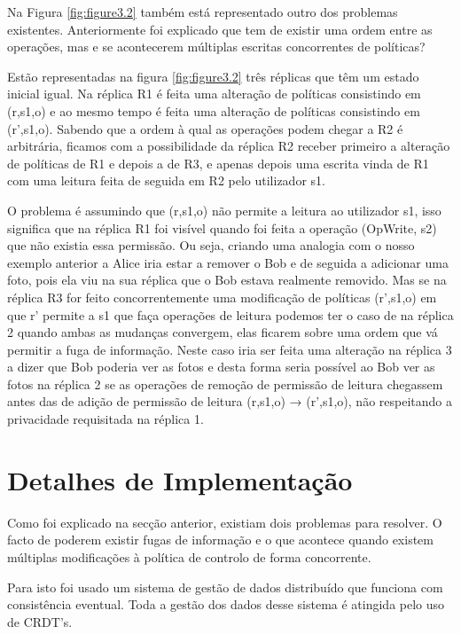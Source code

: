 \documentclass[runningheads,a4paper]{llncs}
\begin{document}
Na Figura \ref{fig:figure3.2} também está representado outro dos problemas existentes. Anteriormente foi explicado que tem de existir uma ordem entre as operações, mas e se acontecerem múltiplas escritas concorrentes de políticas?

Estão representadas na figura \ref{fig:figure3.2} três réplicas que têm um estado inicial igual. Na réplica R1 é feita uma alteração de políticas consistindo em (r,s1,o) e ao mesmo tempo é feita uma alteração de políticas consistindo em (r',s1,o). Sabendo que a ordem à qual as operações podem chegar a R2 é arbitrária, ficamos com a possibilidade da réplica R2 receber primeiro a alteração de políticas de R1 e depois a de R3, e apenas depois uma escrita vinda de R1 com uma leitura feita de seguida em R2 pelo utilizador s1.

O problema é assumindo que (r,s1,o) não permite a leitura ao utilizador s1, isso significa que na réplica R1 foi visível quando foi feita a operação (OpWrite, s2) que não existia essa permissão. Ou seja, criando uma analogia com o nosso exemplo anterior a Alice iria estar a remover o Bob e de seguida a adicionar uma foto, pois ela viu na sua réplica que o Bob estava realmente removido. Mas se na réplica R3 for feito concorrentemente uma modificação de políticas (r',s1,o) em que r' permite a s1 que faça operações de leitura podemos ter o caso de na réplica 2 quando ambas as mudanças convergem, elas ficarem sobre uma ordem que vá permitir a fuga de informação. Neste caso iria ser feita uma alteração na réplica 3 a dizer que Bob poderia ver as fotos e desta forma seria possível ao Bob ver as fotos na réplica 2 se as operações de remoção de permissão de leitura chegassem antes das de adição de permissão de leitura (r,s1,o) → (r',s1,o), não respeitando a privacidade requisitada na réplica 1.


\section{Detalhes de Implementação}\label{sec:implementacao}

Como foi explicado na secção anterior, existiam dois problemas para resolver. O facto de poderem existir fugas de informação e o que acontece quando existem múltiplas modificações à política de controlo de forma concorrente.

Para isto foi usado um sistema de gestão de dados distribuído que funciona com consistência eventual. Toda a gestão dos dados desse sistema é atingida pelo uso de CRDT's.
\end{document}
